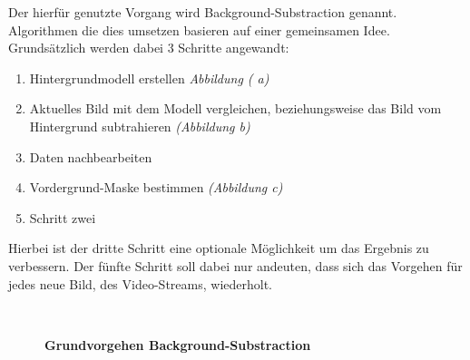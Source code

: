 Der hierfür genutzte Vorgang wird Background-Substraction genannt. Algorithmen die dies umsetzen basieren auf einer gemeinsamen Idee. Grundsätzlich werden dabei 3 Schritte angewandt:
\begin{enumerate}
\item Hintergrundmodell erstellen \textit{Abbildung ( a)}
\item Aktuelles Bild mit dem Modell vergleichen, beziehungsweise das Bild vom Hintergrund subtrahieren \textit{(Abbildung  b)}
\item Daten nachbearbeiten
\item Vordergrund-Maske bestimmen \textit{(Abbildung  c)}
\item Schritt zwei
\end{enumerate}
Hierbei ist der dritte Schritt eine optionale Möglichkeit um das Ergebnis zu verbessern. 
Der fünfte Schritt soll dabei nur andeuten, dass sich das Vorgehen für jedes neue Bild, des Video-Streams, wiederholt.
\begin{figure}[ht]
\qquad
{}\\
\begin{center}
\par\end{center}
\caption{\textbf{Grundvorgehen Background-Substraction}}
\label{Fig:background}
\end{figure}


